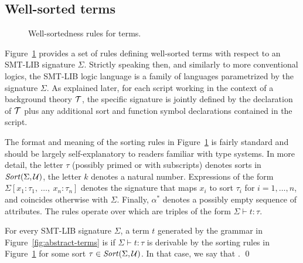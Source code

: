 \subsection{Well-sorted terms}
 
\begin{figure}
 \termrules
\caption{Well-sortedness rules for terms.}
\label{fig:well-sorted-terms}
\end{figure}

Figure~\ref{fig:well-sorted-terms} provides a set of rules defining 
well-sorted terms with respect to an SMT-LIB signature $\Sigma$.
Strictly speaking then, and similarly to more conventional logics,
the SMT-LIB logic language is a family of languages parametrized 
by the signature $\Sigma$.
As explained later, 
for each script working in the context of a background theory $\mathcal{T}$,
the specific signature is jointly defined by the declaration of $\mathcal{T}$ plus
any additional sort and function symbol declarations contained in the script.

The format and meaning of the sorting rules in Figure~\ref{fig:well-sorted-terms} 
is fairly standard and should be largely self-explanatory 
to readers familiar with type systems.
In more detail, the letter $\tau$ (possibly primed or with subscripts) 
denotes sorts in $\mathit{Sort}(\Sigma, \mathcal{U})$,
the letter $k$ denotes a natural number.
%
Expressions of the form $\Sigma[x_1:\tau_1,\: \ldots,\: x_n:\tau_n]$ 
denotes the signature 
that maps $x_i$ to sort $\tau_i$ for $i=1,\ldots,n$, and 
coincides otherwise with $\Sigma$.
Finally, $\alpha^*$ denotes a possibly empty sequence of attributes.
The rules operate over 
which are triples of the form $\Sigma \vdash t : \tau$.

\begin{definition}
For every SMT-LIB signature $\Sigma$,
a term $t$ generated by the grammar in Figure~\ref{fig:abstract-terms}
is 
if $\Sigma \vdash t : \tau$ is derivable 
by the sorting rules in Figure~\ref{fig:well-sorted-terms}
for some sort $\tau \in \mathit{Sort}(\Sigma,\mathcal{U})$.
In that case, 
we say that .
\qed
\end{definition}

